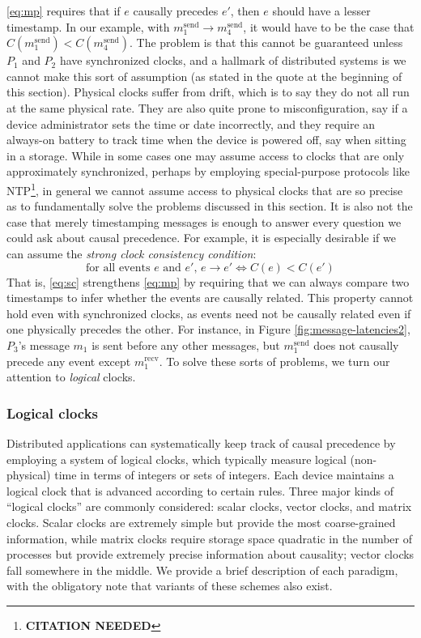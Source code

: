 \documentclass[]             %
{NASA}                       %
\theoremstyle{definition}
\newcommand{\citationneeded}{\footnote{\textbf{CITATION NEEDED}}}
\begin{document}
\ref{eq:mp} requires that if $e$ causally precedes $e'$, then $e$
should have a lesser timestamp. In our example, with
$m_1^\textrm{send} \to m_4^\textrm{send}$, it would have to be the
case that $C(m_1^\textrm{send}) < C(m_4^\textrm{send})$. The problem
is that this cannot be guaranteed unless $P_1$ and $P_2$ have
synchronized clocks, and a hallmark of distributed systems is we
cannot make this sort of assumption (as stated in the quote at the
beginning of this section).  Physical clocks suffer from drift, which
is to say they do not all run at the same physical rate. They are also
quite prone to misconfiguration, say if a device administrator sets
the time or date incorrectly, and they require an always-on battery to
track time when the device is powered off, say when sitting in a
storage. While in some cases one may assume access to clocks that are
only approximately synchronized, perhaps by employing special-purpose
protocols like NTP\citationneeded, in general we cannot assume access
to physical clocks that are so precise as to fundamentally solve the
problems discussed in this section. It is also not the case that
merely timestamping messages is enough to answer every question we
could ask about causal precedence. For example, it is especially
desirable if we can assume the \emph{strong clock consistency
condition}:
\[ \textrm{for all events $e$ and $e'$, } e \to e' \iff C(e) < C(e') \label{eq:sc}\tag{SC} \]
That is, \ref{eq:sc} strengthens \ref{eq:mp} by requiring that we can
always compare two timestamps to infer whether the events are causally
related. This property cannot hold even with synchronized clocks, as
events need not be causally related even if one physically precedes
the other. For instance, in Figure \ref{fig:message-latencies2},
$P_3$'s message $m_1$ is sent before any other messages, but
$m_1^\textrm{send}$ does not causally precede any event except
$m_1^\textrm{recv}$. To solve these sorts of problems, we turn our
attention to \emph{logical} clocks.

\subsubsection{Logical clocks}
Distributed applications can systematically keep track of causal
precedence by employing a system of logical clocks, which typically
measure logical (non-physical) time in terms of integers or sets of
integers. Each device maintains a logical clock that is advanced
according to certain rules. Three major kinds of ``logical clocks''
are commonly considered: scalar clocks, vector clocks, and matrix
clocks. Scalar clocks are extremely simple but provide the most
coarse-grained information, while matrix clocks require storage space
quadratic in the number of processes but provide extremely precise
information about causality; vector clocks fall somewhere in the
middle. We provide a brief description of each paradigm, with the
obligatory note that variants of these schemes also exist.
\end{document}
